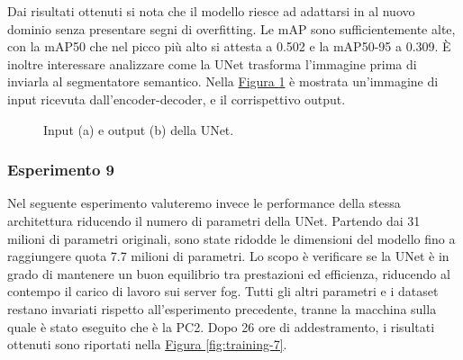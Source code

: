 \documentclass[12pt]{report}
\begin{document}
Dai risultati ottenuti si nota che il modello riesce ad adattarsi in al nuovo dominio senza presentare segni di overfitting. Le mAP sono sufficientemente alte, con la mAP50 che nel picco più alto si attesta a 0.502 e la mAP50-95 a 0.309. È inoltre interessare analizzare come la UNet trasforma l'immagine prima di inviarla al segmentatore semantico. Nella \hyperref[fig:prediciton-4]{Figura \ref{fig:prediciton-4}} è mostrata un'immagine di input ricevuta dall'encoder-decoder, e il corrispettivo output.

\begin{figure}[h!]
	\centering
	\hspace{0.01\textwidth}
	\caption{Input (a) e output (b) della UNet.}
	\label{fig:prediciton-4}
\end{figure}

\subsubsection{Esperimento 9}
\label{sec:esperimento_9}

Nel seguente esperimento valuteremo invece le performance della stessa architettura riducendo il numero di parametri della UNet. Partendo dai 31 milioni di parametri originali, sono state ridodde le dimensioni del modello fino a raggiungere quota 7.7 milioni di parametri. Lo scopo è verificare se la UNet è in grado di mantenere un buon equilibrio tra prestazioni ed efficienza, riducendo al contempo il carico di lavoro sui server fog. Tutti gli altri parametri e i dataset restano invariati rispetto all'esperimento precedente, tranne la macchina sulla quale è stato eseguito che è la PC2. Dopo 26 ore di addestramento, i risultati ottenuti sono riportati nella \hyperref[fig:training-7]{Figura \ref{fig:training-7}}.
\end{document}
